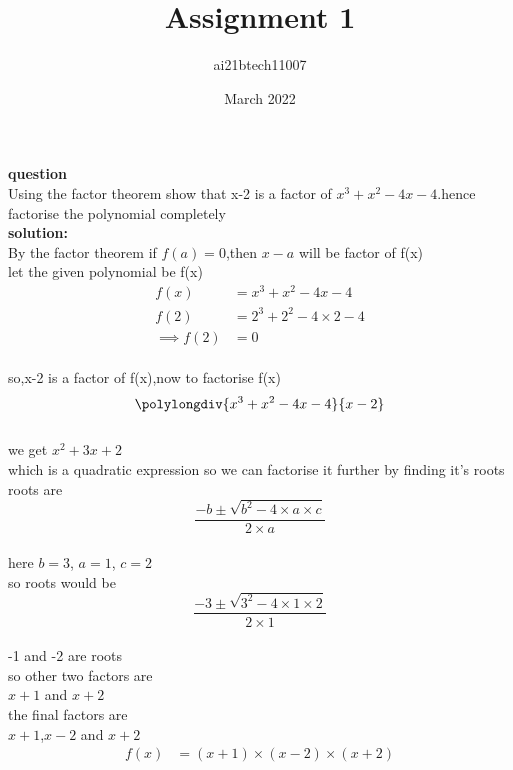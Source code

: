 \documentclass[12pt,two column]{article}
\title{Assignment 1}
\author{ai21btech11007 }
\date{March 2022}
\begin{document}
\maketitle
\textbf{question}\\
Using the factor theorem show that x-2 is a factor of $x^3+x^2-4x-4$.hence factorise the polynomial completely
\\

\textbf{solution: }\\
By the factor theorem if $f(a)=0$,then $x-a$ will be factor of f(x)
\\let the given polynomial be f(x)
\begin{align}
  f(x) &= x^3+x^2-4x-4\\  
  f(2) &= 2^3+2^2-4\times2-4\\
\implies
f(2) &= 0
\end{align}
   \\so,x-2 is a factor of f(x),now to factorise f(x) 
\[
 \polylongdiv{x^3+x^2-4x-4}{x-2}
 \]
  \\we get $x^2+3x+2$
  \\which is a quadratic expression so we can factorise it further by finding it's roots
  \\roots are 
  \[ \frac{-b \pm \sqrt{b^2-4\times a\times c}}{2\times a} \]
  \\here { $b= 3$,
           $a=1$,
           $c=2$ }
 \\so roots would be
   \[ \frac{-3 \pm \sqrt{3^2-4\times 1\times 2}}{2\times 1} \]
   \\ -1 and -2 are roots
   \\so other two factors are
  \\$x+1$ and $x+2$
  \\the final factors are 
  \\$x+1$,$x-2$ and $x+2$
\begin{align}
f(x)&=( x+1)\times( x-2)\times( x+2)
\end{align}
\end{document}
